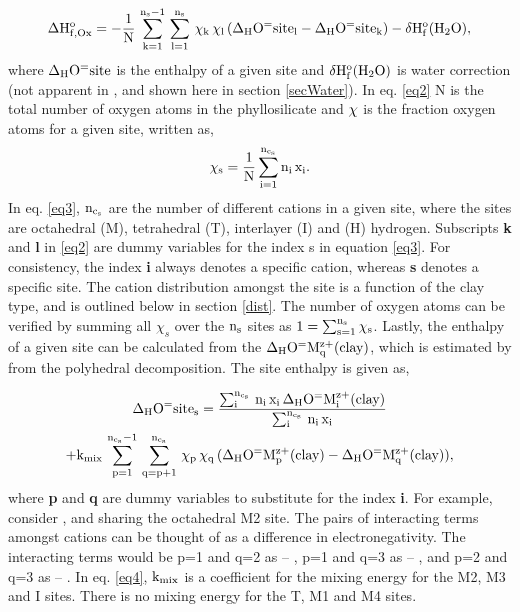 \documentclass[12pt]{article} %
\numberwithin{equation}{section}
\numberwithin{table}{section}
\numberwithin{figure}{section}
\begin{document}
\begin{equation}
\rm \Delta H_{f,Ox}^o = -\frac{1}{N}\,\sum_{k=1}^{n_s-1}\,\sum_{l=1}^{n_s}\,\chi_k\,\chi_l\,(\Delta_HO^=site_l-\Delta_HO^=site_k) - \delta H_f^o(H_2O),
\label{eq2}
\end{equation}
where $\rm \Delta_HO^=site$ is the enthalpy of a given site and $\rm \delta H_f^o(H_2O)$ is water correction (not apparent in \cite{Blanc2015}, and shown here in section \ref{secWater}). In eq. \ref{eq2} N is the total number of oxygen atoms in the phyllosilicate and $\rm \chi$ is the fraction oxygen atoms for a given site, written as, 
\begin{equation}
\rm \chi_s = \frac{1}{N}\sum_{i=1}^{n_{c_s}} n_i\,x_i.
\label{eq3}
\end{equation}
In eq. \ref{eq3}, $\rm n_{c_s}$ are the number of different cations in a given site, where the sites are octahedral (M), tetrahedral (T), interlayer (I) and (H) hydrogen. Subscripts {\bf k} and {\bf l} in \ref{eq2} are dummy variables for the index s in equation \ref{eq3}. For consistency, the index {\bf i} always denotes a specific cation, whereas {\bf s} denotes a specific site. The cation distribution amongst the site is a function of the clay type, and is outlined below in section \ref{dist}. The number of oxygen atoms can be verified by summing all $\chi_s$ over the $\rm n_s$ sites as $\rm 1 = \sum_{s=1}^{n_s}\chi_s$. Lastly, the enthalpy of a given site can be calculated from the $\rm \Delta_HO^=M_q^{z+}(clay)$, which is estimated by \cite{Blanc2015} from the polyhedral decomposition. The site enthalpy is given as,

\begin{multline}
\rm \Delta_HO^=site_s = \frac{\sum_{i}^{n_{c_s}}\,n_i\,x_i\,\Delta_HO^=M_i^{z+}(clay)}{\sum_{i}^{n_{c_s}}\,n_i\,x_i}  \\
\rm+ k_{mix}\,\sum_{p=1}^{n_{c_s}-1}\,\sum_{q=p+1}^{n_{c_s}}\,\chi_p\,\chi_q\,(\Delta_HO^=M_p^{z+}(clay)-\Delta_HO^=M_q^{z+}(clay)),
\label{eq4}
\end{multline}
where {\bf p} and {\bf q} are dummy variables to substitute for the index {\bf i}. For example, consider ,  and  sharing the octahedral M2 site. The pairs of interacting terms amongst cations can be thought of as a difference in electronegativity. The interacting terms would be p=1 and q=2 as -- , p=1 and q=3 as -- , and p=2 and q=3 as -- . In eq. \ref{eq4}, $\rm k_{mix}$ is a coefficient for the mixing energy for the M2, M3 and I sites. There is no mixing energy for the T, M1 and M4 sites. 
\end{document}
